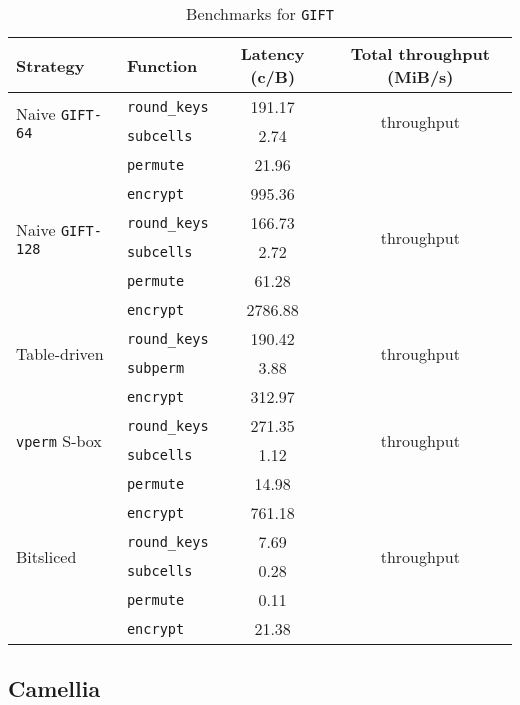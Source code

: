 \begin{table}[h!]
    \centering
    \small
    \begin{tabular}{llcc}
        \toprule
        Strategy & Function & Latency (c/B) & Total throughput (MiB/s) \\
        \midrule
        \multirow{2}{*}{Naive \texttt{GIFT-64}} & \texttt{round\_keys} & 191.17 & \multirow{2}{*}{throughput} \\
                                                & \texttt{subcells} & 2.74 & \\
                                                & \texttt{permute} & 21.96 & \\
                                                & \texttt{encrypt} & 995.36 & \\
        \midrule
        \multirow{2}{*}{Naive \texttt{GIFT-128}} & \texttt{round\_keys} & 166.73 & \multirow{2}{*}{throughput} \\
                                                 & \texttt{subcells} & 2.72 & \\
                                                 & \texttt{permute} & 61.28 & \\
                                                 & \texttt{encrypt} & 2786.88 & \\
        \midrule
        \multirow{2}{*}{Table-driven} & \texttt{round\_keys} & 190.42 & \multirow{2}{*}{throughput} \\
                                                & \texttt{subperm} & 3.88 & \\
                                                & \texttt{encrypt} & 312.97 & \\
        \midrule
        \multirow{2}{*}{\texttt{vperm} S-box} & \texttt{round\_keys} & 271.35 & \multirow{2}{*}{throughput} \\
                                              & \texttt{subcells} & 1.12 & \\
                                              & \texttt{permute} & 14.98 & \\
                                              & \texttt{encrypt} & 761.18 & \\
        \midrule
        \multirow{2}{*}{Bitsliced} & \texttt{round\_keys} & 7.69 & \multirow{2}{*}{throughput} \\
                                   & \texttt{subcells} & 0.28 & \\
                                   & \texttt{permute} & 0.11 & \\
                                   & \texttt{encrypt} & 21.38 & \\
        \bottomrule
    \end{tabular}
    \caption{Benchmarks for \texttt{GIFT}}
\end{table}

\subsection{Camellia}
